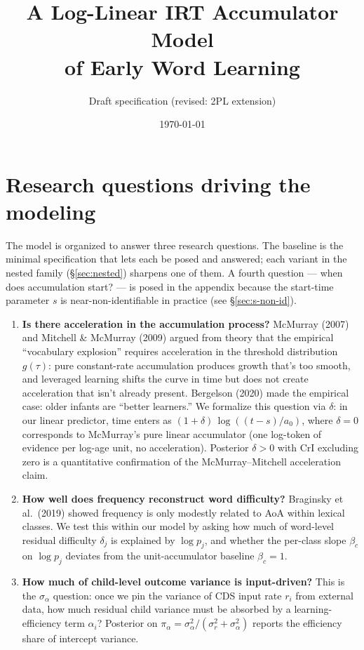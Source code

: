 \documentclass[11pt]{article}
\title{A Log-Linear IRT Accumulator Model\\ of Early Word Learning}
\author{Draft specification (revised: 2PL extension)}
\date{\today}
\begin{document}
\maketitle

\section{Research questions driving the modeling}

The model is organized to answer three research questions. The baseline
is the minimal specification that lets each be posed and answered;
each variant in the nested family (§\ref{sec:nested}) sharpens one of
them. A fourth question — when does accumulation start? — is posed in
the appendix because the start-time parameter \(s\) is
near-non-identifiable in practice (see §\ref{sec:s-non-id}).

\begin{enumerate}[leftmargin=1.3em, label=\textbf{RQ\arabic*.}]
\item \textbf{Is there acceleration in the accumulation process?}
  McMurray (2007) and Mitchell \& McMurray (2009) argued from theory
  that the empirical ``vocabulary explosion'' requires acceleration in
  the threshold distribution \(g(\tau)\): pure constant-rate
  accumulation produces growth that's too smooth, and leveraged
  learning shifts the curve in time but does not create acceleration
  that isn't already present. Bergelson (2020) made the empirical
  case: older infants are ``better learners.'' We formalize this
  question via \(\delta\): in our linear predictor, time enters as
  \((1 + \delta)\,\log\!((t-s)/a_0)\), where \(\delta = 0\)
  corresponds to McMurray's pure linear accumulator (one log-token of
  evidence per log-age unit, no acceleration). Posterior \(\delta > 0\)
  with CrI excluding zero is a quantitative confirmation of the
  McMurray–Mitchell acceleration claim.

\item \textbf{How well does frequency reconstruct word difficulty?}
  Braginsky et al.\ (2019) showed frequency is only modestly related
  to AoA within lexical classes. We test this within our model by
  asking how much of word-level residual difficulty \(\delta_j\) is
  explained by \(\log p_j\), and whether the per-class slope
  \(\beta_c\) on \(\log p_j\) deviates from the unit-accumulator
  baseline \(\beta_c = 1\).

\item \textbf{How much of child-level outcome variance is input-driven?}
  This is the \(\sigma_\alpha\) question: once we pin the variance of
  CDS input rate \(r_i\) from external data, how much residual child
  variance must be absorbed by a learning-efficiency term
  \(\alpha_i\)? Posterior on
  \(\pi_\alpha = \sigma_\alpha^2 / (\sigma_r^2 + \sigma_\alpha^2)\)
  reports the efficiency share of intercept variance.
\end{enumerate}
\end{document}
